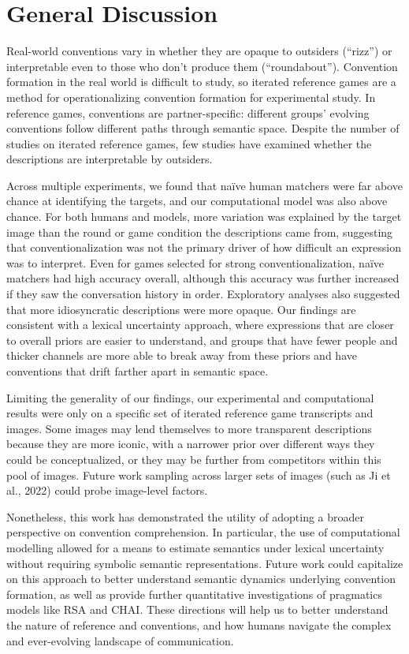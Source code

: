 \documentclass[10pt, letterpaper]{article}
\begin{document}
\section{General Discussion}\label{general-discussion}

Real-world conventions vary in whether they are opaque to outsiders
(``rizz'') or interpretable even to those who don't produce them
(``roundabout''). Convention formation in the real world is difficult to
study, so iterated reference games are a method for operationalizing
convention formation for experimental study. In reference games,
conventions are partner-specific: different groups' evolving conventions
follow different paths through semantic space. Despite the number of
studies on iterated reference games, few studies have examined whether
the descriptions are interpretable by outsiders.

Across multiple experiments, we found that naïve human matchers were far
above chance at identifying the targets, and our computational model was
also above chance. For both humans and models, more variation was
explained by the target image than the round or game condition the
descriptions came from, suggesting that conventionalization was not the
primary driver of how difficult an expression was to interpret. Even for
games selected for strong conventionalization, naïve matchers had high
accuracy overall, although this accuracy was further increased if they
saw the conversation history in order. Exploratory analyses also
suggested that more idiosyncratic descriptions were more opaque. Our
findings are consistent with a lexical uncertainty approach, where
expressions that are closer to overall priors are easier to understand,
and groups that have fewer people and thicker channels are more able to
break away from these priors and have conventions that drift farther
apart in semantic space.

Limiting the generality of our findings, our experimental and
computational results were only on a specific set of iterated reference
game transcripts and images. Some images may lend themselves to more
transparent descriptions because they are more iconic, with a narrower
prior over different ways they could be conceptualized, or they may be
further from competitors within this pool of images. Future work
sampling across larger sets of images (such as Ji et al., 2022) could
probe image-level factors.

Nonetheless, this work has demonstrated the utility of adopting a
broader perspective on convention comprehension. In particular, the use
of computational modelling allowed for a means to estimate semantics
under lexical uncertainty without requiring symbolic semantic
representations. Future work could capitalize on this approach to better
understand semantic dynamics underlying convention formation, as well as
provide further quantitative investigations of pragmatics models like
RSA and CHAI. These directions will help us to better understand the
nature of reference and conventions, and how humans navigate the complex
and ever-evolving landscape of communication.
\end{document}
